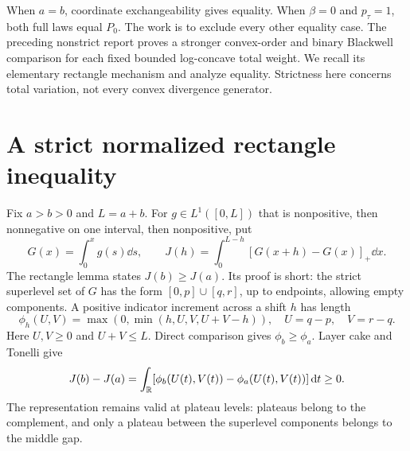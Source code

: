 \documentclass[11pt,a4paper]{article}
\theoremstyle{remark}\newtheorem*{ednote}{Editorial note (ProveIt, 2026-10-01)}
\begin{document}
When $a=b$, coordinate exchangeability gives equality. When $\beta=0$ and $p_\tau=1$, both full laws equal $P_0$. The work is to exclude every other equality case. The preceding nonstrict report \cite{Nonstrict} proves a stronger convex-order and binary Blackwell comparison for each fixed bounded log-concave total weight. We recall its elementary rectangle mechanism and analyze equality. Strictness here concerns total variation, not every convex divergence generator.

\section{A strict normalized rectangle inequality}
Fix $a>b>0$ and $L=a+b$. For $g\in L^1([0,L])$ that is nonpositive, then nonnegative on one interval, then nonpositive, put
\[
 G(x)=\int_0^xg(s)\dd s,
 \qquad J(h)=\int_0^{L-h}[G(x+h)-G(x)]_+\dd x.
\]
The rectangle lemma states $J(b)\ge J(a)$. Its proof is short: the strict superlevel set of $G$ has the form $[0,p]\cup[q,r]$, up to endpoints, allowing empty components. A positive indicator increment across a shift $h$ has length
\begin{equation}\label{eq:phi}
 \phi_h(U,V)=\max(0,\min(h,U,V,U+V-h)),
 \quad U=q-p,\quad V=r-q.
\end{equation}
Here $U,V\ge0$ and $U+V\le L$. Direct comparison gives $\phi_b\ge\phi_a$. Layer cake and Tonelli give
\begin{equation}\label{eq:layer}
 J(b)-J(a)=\int_\mathbb R[\phi_b(U(t),V(t))-\phi_a(U(t),V(t))]\,\mathrm d t\ge0.
\end{equation}
The representation remains valid at plateau levels: plateaus belong to the complement, and only a plateau between the superlevel components belongs to the middle gap.
\end{document}
